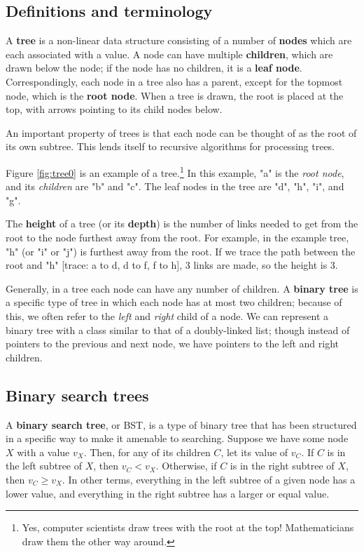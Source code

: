 \subsection{Definitions and terminology}

A \textbf{tree} is a non-linear data structure consisting of a number of \textbf{nodes} which are each associated with a value. A node can have multiple \textbf{children}, which are drawn below the node; if the node has no children, it is a \textbf{leaf node}. Correspondingly, each node in a tree also has a parent, except for the topmost node, which is the \textbf{root node}. When a tree is drawn, the root is placed at the top, with arrows pointing to its child nodes below.

An important property of trees is that each node can be thought of as the root of its own subtree. This lends itself to recursive algorithms for processing trees.

Figure \ref{fig:tree0} is an example of a tree.\footnote{Yes, computer scientists draw trees with the root at the top! Mathematicians draw them the other way around.} In this example, "a" is the \textit{root node}, and its \textit{children} are "b" and "c". The leaf nodes in the tree are "d", "h", "i", and "g".


The \textbf{height} of a tree (or its \textbf{depth}) is the number of links needed to get from the root to the node furthest away from the root. For example, in the example tree, "h" (or "i" or "j") is furthest away from the root. If we trace the path between the root and "h" [trace: a to d, d to f, f to h], 3 links are made, so the height is 3.


Generally, in a tree each node can have any number of children. A \textbf{binary tree} is a specific type of tree in which each node has at most two children; because of this, we often refer to the \textit{left} and \textit{right} child of a node. We can represent a binary tree with a class similar to that of a doubly-linked list; though instead of pointers to the previous and next node, we have pointers to the left and right children.


\subsection{Binary search trees} \label{sec:bst}

A \textbf{binary search tree}, or BST, is a type of binary tree that has been structured in a specific way to make it amenable to searching. Suppose we have some node $X$ with a value $v_X$. Then, for any of its children $C$, let its value of $v_C$. If $C$ is in the left subtree of $X$, then $v_C < v_X$. Otherwise, if $C$ is in the right subtree of $X$, then $v_C \geq v_X$. In other terms, everything in the left subtree of a given node has a lower value, and everything in the right subtree has a larger or equal value.


